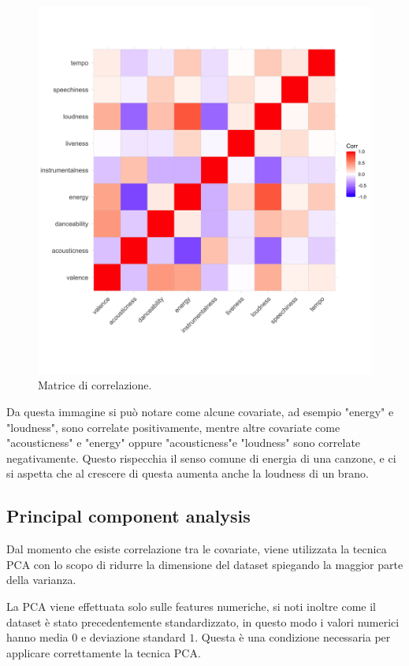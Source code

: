 \begin{figure}[H]
	\centering
	\includegraphics[width=14cm]{../images/correlation.png}
	\caption{Matrice di correlazione.}
\end{figure}

Da questa immagine si può notare come alcune covariate, ad esempio
"energy" e "loudness", sono correlate positivamente, mentre altre
covariate come "acousticness" e "energy" oppure "acousticness"e
"loudness" sono correlate negativamente. Questo rispecchia il senso
comune di energia di una canzone, e ci si aspetta che al crescere di
questa aumenta anche la loudness di un brano.

\subsection{Principal component analysis}
\label{sec:pca}
Dal momento che esiste correlazione tra le covariate, viene utilizzata
la tecnica PCA con lo scopo di ridurre la dimensione del dataset
spiegando la maggior parte della varianza.

La PCA viene effettuata solo sulle features numeriche, si noti inoltre
come il dataset è stato precedentemente standardizzato, in questo modo
i valori numerici hanno media $0$ e deviazione standard $1$. Questa è
una condizione necessaria per applicare correttamente la tecnica PCA.

